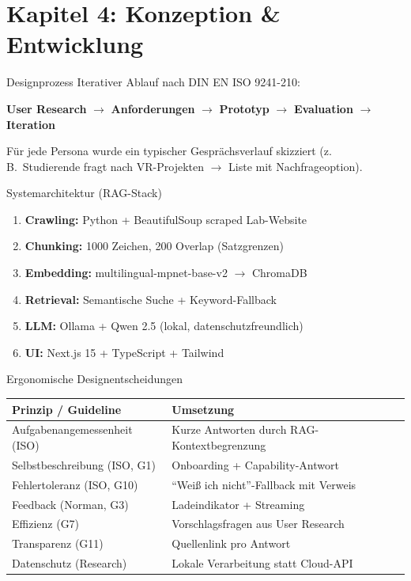 \documentclass[14pt,aspectratio=169]{beamer}
\begin{document}
\section{Kapitel 4: Konzeption \& Entwicklung}

\begin{frame}{Designprozess}
    Iterativer Ablauf nach DIN EN ISO 9241-210:
    \begin{center}
        \textbf{User Research} $\rightarrow$ \textbf{Anforderungen} $\rightarrow$ \textbf{Prototyp} $\rightarrow$ \textbf{Evaluation} $\rightarrow$ \textbf{Iteration}
    \end{center}
    \vspace{0.3cm}
    Für jede Persona wurde ein typischer Gesprächsverlauf skizziert (z.\,B.\ Studierende fragt nach VR-Projekten $\rightarrow$ Liste mit Nachfrageoption).
\end{frame}

\begin{frame}{Systemarchitektur (RAG-Stack)}
    \begin{enumerate}
        \item \textbf{Crawling:} Python + BeautifulSoup scraped Lab-Website
        \item \textbf{Chunking:} 1000 Zeichen, 200 Overlap (Satzgrenzen)
        \item \textbf{Embedding:} multilingual-mpnet-base-v2 $\rightarrow$ ChromaDB
        \item \textbf{Retrieval:} Semantische Suche + Keyword-Fallback
        \item \textbf{LLM:} Ollama + Qwen 2.5 (lokal, datenschutzfreundlich)
        \item \textbf{UI:} Next.js 15 + TypeScript + Tailwind
    \end{enumerate}
\end{frame}

\begin{frame}{Ergonomische Designentscheidungen}
    \small
    \begin{tabularx}{\textwidth}{@{}l X@{}}
        \toprule
        \textbf{Prinzip / Guideline} & \textbf{Umsetzung} \\
        \midrule
        Aufgabenangemessenheit (ISO) & Kurze Antworten durch RAG-Kontextbegrenzung \\
        Selbstbeschreibung (ISO, G1) & Onboarding + Capability-Antwort \\
        Fehlertoleranz (ISO, G10) & ``Weiß ich nicht''-Fallback mit Verweis \\
        Feedback (Norman, G3) & Ladeindikator + Streaming \\
        Effizienz (G7) & Vorschlagsfragen aus User Research \\
        Transparenz (G11) & Quellenlink pro Antwort \\
        Datenschutz (Research) & Lokale Verarbeitung statt Cloud-API \\
        \bottomrule
    \end{tabularx}
    \normalsize
\end{frame}
\end{document}
